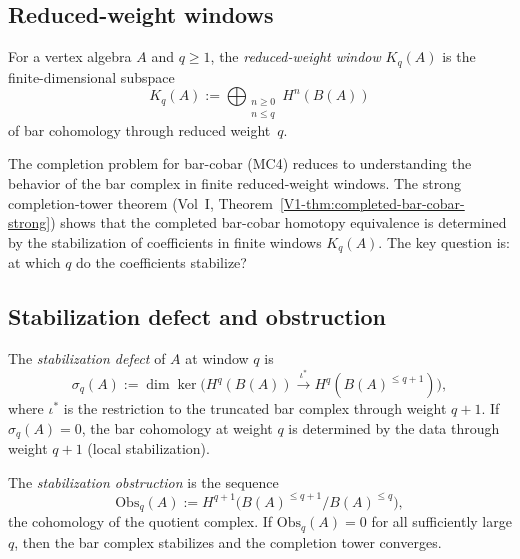 \subsection{Reduced-weight windows}

\begin{definition}
For a vertex algebra $A$ and $q \ge 1$, the \emph{reduced-weight window}
$K_q(A)$ is the finite-dimensional subspace
\begin{equation}%
K_q(A)
:=
\bigoplus_{\substack{n \ge 0 \\ n \le q}}
H^n(B(A))
\end{equation}
of bar cohomology through reduced weight~$q$.
\end{definition}

\begin{remark}
The completion problem for bar-cobar (MC4) reduces to understanding
the behavior of the bar complex in finite reduced-weight windows.
The strong completion-tower theorem
(Vol~I, Theorem~\ref*{V1-thm:completed-bar-cobar-strong})
shows that the completed bar-cobar homotopy equivalence is
determined by the stabilization of coefficients in finite windows
$K_q(A)$. The key question is: at which $q$ do the coefficients
stabilize?
\end{remark}

\subsection{Stabilization defect and obstruction}

\begin{definition}
The \emph{stabilization defect} of $A$ at window $q$ is
\begin{equation}%
\sigma_q(A)
:=
\dim\ker\bigl(H^q(B(A)) \xrightarrow{\iota^*}
H^q(B(A)^{\le q+1})\bigr),
\end{equation}
where $\iota^*$ is the restriction to the truncated bar complex through
weight $q+1$. If $\sigma_q(A) = 0$, the bar cohomology at weight $q$
is determined by the data through weight $q+1$ (local stabilization).
\end{definition}

\begin{definition}
The \emph{stabilization obstruction} is the sequence
\begin{equation}%
\mathrm{Obs}_q(A)
:=
H^{q+1}\bigl(B(A)^{\le q+1} / B(A)^{\le q}\bigr),
\end{equation}
the cohomology of the quotient complex. If
$\mathrm{Obs}_q(A) = 0$ for all sufficiently large $q$, then the
bar complex stabilizes and the completion tower converges.
\end{definition}

